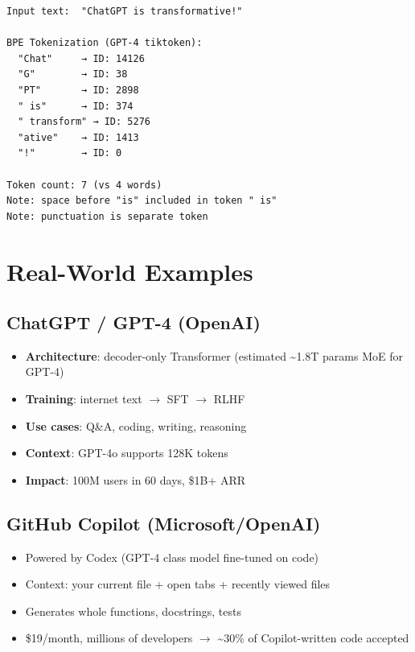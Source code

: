\documentclass[11pt]{article}
\providecommand{\tightlist}{\setlength{\itemsep}{1pt}\setlength{\parskip}{0pt}}
\begin{document}
\setcodelang{}

\begin{verbatim}
Input text:  "ChatGPT is transformative!"

BPE Tokenization (GPT-4 tiktoken):
  "Chat"     → ID: 14126
  "G"        → ID: 38
  "PT"       → ID: 2898
  " is"      → ID: 374
  " transform" → ID: 5276
  "ative"    → ID: 1413
  "!"        → ID: 0

Token count: 7 (vs 4 words)
Note: space before "is" included in token " is"
Note: punctuation is separate token
\end{verbatim}

\section{Real-World Examples}\label{real-world-examples}

\subsection{ChatGPT / GPT-4 (OpenAI)}\label{chatgpt--gpt-4-openai}

\begin{itemize}
\tightlist
\item
  \textbf{Architecture}: decoder-only Transformer (estimated \textasciitilde1.8T params MoE for GPT-4)
\item
  \textbf{Training}: internet text \(\rightarrow\) SFT \(\rightarrow\) RLHF
\item
  \textbf{Use cases}: Q\&A, coding, writing, reasoning
\item
  \textbf{Context}: GPT-4o supports 128K tokens
\item
  \textbf{Impact}: 100M users in 60 days, \$1B+ ARR
\end{itemize}

\subsection{GitHub Copilot (Microsoft/OpenAI)}\label{github-copilot-microsoftopenai}

\begin{itemize}
\tightlist
\item
  Powered by Codex (GPT-4 class model fine-tuned on code)
\item
  Context: your current file + open tabs + recently viewed files
\item
  Generates whole functions, docstrings, tests
\item
  \$19/month, millions of developers \(\rightarrow\) \textasciitilde30\% of Copilot-written code accepted
\end{itemize}
\end{document}
